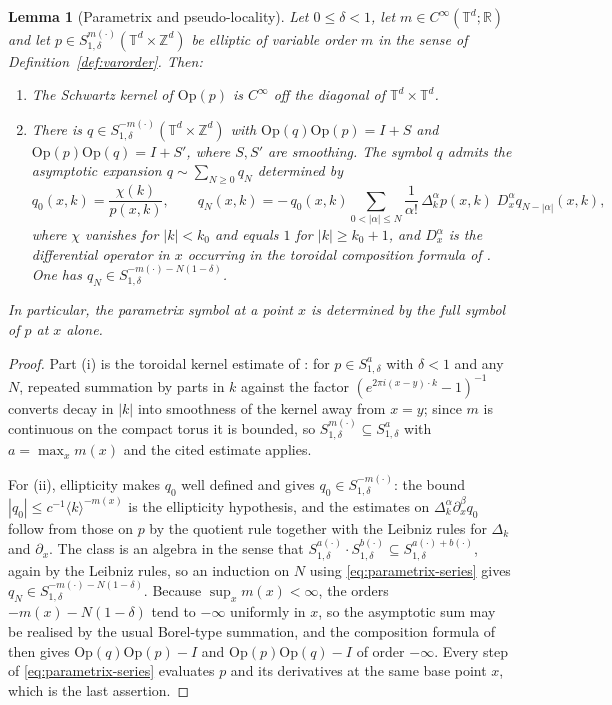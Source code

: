 \documentclass[pdflatex,sn-mathphys,Numbered]{sn-jnl}
\theoremstyle{thmstyleone}%
\newtheorem{lemma}[theorem]{Lemma}%
\theoremstyle{thmstyletwo}%
\theoremstyle{thmstylethree}%
\newcommand{\RR}{\mathbb{R}}
\newcommand{\ZZ}{\mathbb{Z}}
\newcommand{\TT}{\mathbb{T}}
\newcommand{\Op}{\mathrm{Op}}
\begin{document}
\begin{appendices}
\begin{lemma}[Parametrix and pseudo-locality]\label{lem:parametrix}
Let $0 \leq \delta < 1$, let $m \in C^\infty(\TT^d;\RR)$ and let
$p \in S^{m(\cdot)}_{1,\delta}(\TT^d\times\ZZ^d)$ be elliptic of variable order
$m$ in the sense of Definition~\ref{def:varorder}. Then:
\begin{enumerate}
\item[(i)] The Schwartz kernel of $\Op(p)$ is $C^\infty$ off the diagonal of
$\TT^d\times\TT^d$.
\item[(ii)] There is $q \in S^{-m(\cdot)}_{1,\delta}(\TT^d\times\ZZ^d)$ with
$\Op(q)\Op(p) = I + S$ and $\Op(p)\Op(q) = I + S'$, where $S,S'$ are smoothing.
The symbol $q$ admits the asymptotic expansion $q \sim \sum_{N\geq0}q_N$
determined by
\begin{equation}\label{eq:parametrix-series}
    q_0(x,k) = \frac{\chi(k)}{p(x,k)}, \qquad
    q_N(x,k) = -\,q_0(x,k)\!\!\sum_{0<|\alpha|\leq N}\frac{1}{\alpha!}\,
        \Delta_k^{\alpha}p(x,k)\; D_x^{\alpha} q_{N-|\alpha|}(x,k) ,
\end{equation}
where $\chi$ vanishes for $|k| < k_0$ and equals $1$ for $|k| \geq k_0+1$, and
$D_x^{\alpha}$ is the differential operator in $x$ occurring in the toroidal
composition formula of \cite{ruzhansky,ruzhansky-book}. One has
$q_N \in S^{-m(\cdot)-N(1-\delta)}_{1,\delta}$.
\end{enumerate}
In particular, the parametrix symbol at a point $x$ is determined by the full
symbol of $p$ at $x$ alone.
\end{lemma}

\begin{proof}
Part (i) is the toroidal kernel estimate of \cite{duvan1}: for
$p \in S^{a}_{1,\delta}$ with $\delta<1$ and any $N$, repeated summation by
parts in $k$ against the factor $(e^{2\pi i(x-y)\cdot k}-1)^{-1}$ converts decay
in $|k|$ into smoothness of the kernel away from $x=y$; since $m$ is continuous
on the compact torus it is bounded, so $S^{m(\cdot)}_{1,\delta} \subseteq
S^{a}_{1,\delta}$ with $a = \max_x m(x)$ and the cited estimate applies.

For (ii), ellipticity makes $q_0$ well defined and gives
$q_0 \in S^{-m(\cdot)}_{1,\delta}$: the bound $|q_0| \leq c^{-1}\langle
k\rangle^{-m(x)}$ is the ellipticity hypothesis, and the estimates on
$\Delta_k^{\alpha}\partial_x^{\beta}q_0$ follow from those on $p$ by the
quotient rule together with the Leibniz rules for $\Delta_k$ and $\partial_x$.
The class is an algebra in the sense that
$S^{a(\cdot)}_{1,\delta}\cdot S^{b(\cdot)}_{1,\delta} \subseteq
S^{a(\cdot)+b(\cdot)}_{1,\delta}$, again by the Leibniz rules, so an induction on
$N$ using \eqref{eq:parametrix-series} gives $q_N \in
S^{-m(\cdot)-N(1-\delta)}_{1,\delta}$. Because
$\sup_x m(x) < \infty$, the orders $-m(x)-N(1-\delta)$ tend to $-\infty$
uniformly in $x$, so the asymptotic sum may be realised by the usual Borel-type
summation, and the composition formula of \cite{ruzhansky,ruzhansky-book} then
gives $\Op(q)\Op(p)-I$ and $\Op(p)\Op(q)-I$ of order $-\infty$. Every step of
\eqref{eq:parametrix-series} evaluates $p$ and its derivatives at the same base
point $x$, which is the last assertion.
\end{proof}


\end{appendices}
\end{document}
